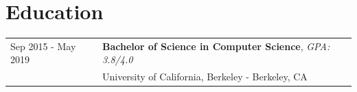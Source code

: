 
\section{Education}
\begin{tabularx}{\linewidth}{@{}l X@{}}	
Sep 2015 - May 2019 & \textbf{Bachelor of Science in Computer Science}, \textit{GPA: 3.8/4.0} \\
& University of California, Berkeley - Berkeley, CA \\
\end{tabularx}
